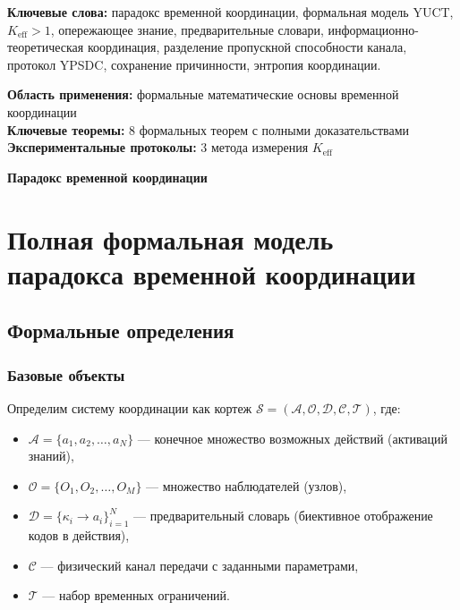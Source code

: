 \documentclass[12pt]{article}
\begin{document}
\begin{titlepage}
\begin{center}
			\vspace{0.5cm}
			\normalsize
			\textbf{Ключевые слова:} парадокс временной координации, формальная модель YUCT, $K_{\text{eff}} > 1$, опережающее знание, предварительные словари, информационно-теоретическая координация, разделение пропускной способности канала, протокол YPSDC, сохранение причинности, энтропия координации.
			
			\vspace{0cm}
			\normalsize
			
			\textbf{Область применения:} формальные математические основы временной координации \\
			\textbf{Ключевые теоремы:} 8 формальных теорем с полными доказательствами \\
			\textbf{Экспериментальные протоколы:} 3 метода измерения $K_{\text{eff}}$ \\
			
			\vspace{0.5cm}
			\normalsize
			
		\end{center}
	\end{titlepage}	
	\begin{center}
		\vspace*{0.5cm}
		\Huge\textbf{Парадокс временной координации}
		\vspace{1cm}
	\end{center}
	
	\section{Полная формальная модель парадокса временной координации}
	\label{app:formal-model}
	
	\subsection{Формальные определения}
	\label{app:definitions}
	
	\subsubsection{Базовые объекты}
	
	Определим систему координации как кортеж $\mathcal{S} = (\mathcal{A}, \mathcal{O}, \mathcal{D}, \mathcal{C}, \mathcal{T})$, где:
	
	\begin{itemize}
		\item $\mathcal{A} = \{a_1, a_2, \dots, a_N\}$ — конечное множество возможных действий (активаций знаний),
		\item $\mathcal{O} = \{O_1, O_2, \dots, O_M\}$ — множество наблюдателей (узлов),
		\item $\mathcal{D} = \{\kappa_i \to a_i\}_{i=1}^N$ — предварительный словарь (биективное отображение кодов в действия),
		\item $\mathcal{C}$ — физический канал передачи с заданными параметрами,
		\item $\mathcal{T}$ — набор временных ограничений.
	\end{itemize}
	
\end{document}
